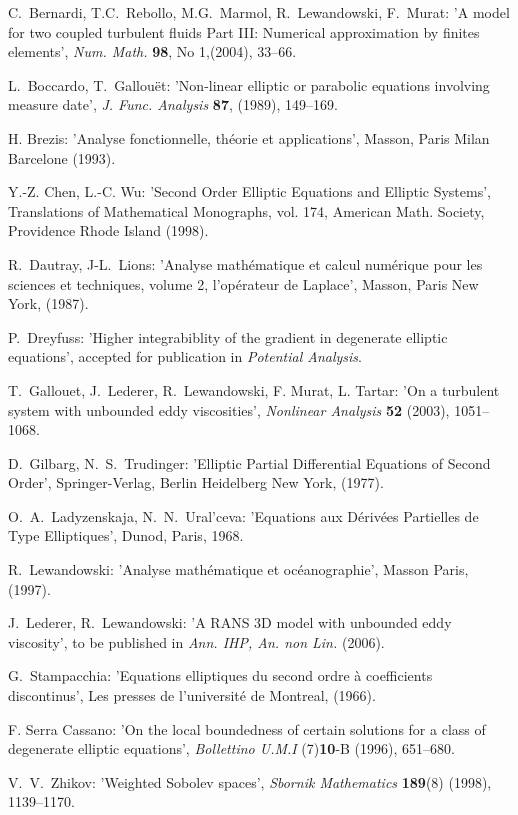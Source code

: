 \documentclass{elsart}
\begin{document}
\begin{thebibliography}{sto}

C.\ Bernardi, T.C.\ Rebollo, M.G.\ Marmol, R.\ Lewandowski, 
F.\ Murat: 
'A model for two coupled turbulent fluids Part III: Numerical 
approximation by finites elements',
{\it Num. Math.} {\bf 98}, No 1,(2004), 33--66.

L.\ Boccardo, T.\ Gallou\"et:
'Non-linear elliptic or parabolic equations involving measure date', 
{\it J. Func. Analysis} {\bf 87}, (1989), 149--169.

H. Brezis: 
'Analyse fonctionnelle, th\'eorie et applications', 
Masson, Paris Milan Barcelone (1993).

Y.-Z. Chen, L.-C. Wu:
'Second Order Elliptic Equations and Elliptic Systems',
Translations of Mathematical Monographs, vol. 174, 
American Math. Society, Providence Rhode Island (1998). 

R.\ Dautray, J-L.\ Lions:
'Analyse math\'ematique et calcul num\'erique pour les 
sciences et techniques, volume 2, l'op\'erateur de Laplace', 
Masson, Paris New York, (1987).

P.\ Dreyfuss:
'Higher integrabiblity of the gradient in degenerate elliptic
equations', 
accepted for publication in {\it Potential Analysis}.

T.\ Gallouet, J.\ Lederer, R.\ Lewandowski, F. Murat, L. Tartar:
'On a turbulent system with unbounded eddy viscosities', 
{\it Nonlinear Analysis} {\bf 52} (2003), 1051--1068.

D.\ Gilbarg, N.\ S.\ Trudinger:
'Elliptic Partial Differential Equations of Second Order', 
Springer-Verlag, Berlin Heidelberg New York, (1977).

O.\ A.\ Ladyzenskaja, N.\ N.\ Ural'ceva: 
'Equations aux D\'eriv\'ees Partielles de Type Elliptiques', Dunod,
Paris, 1968.

R.\ Lewandowski:
'Analyse math\'ematique et oc\'eanographie', 
Masson Paris, (1997).

J.\ Lederer, R.\ Lewandowski:
'A RANS 3D model with unbounded eddy viscosity',  
to be published in {\it Ann. IHP, An. non Lin.} (2006).

G.\ Stampacchia:
'Equations elliptiques du second ordre \`a coefficients 
discontinus', Les presses de l'universit\'e de Montreal, (1966).

F. Serra Cassano:
'On the local boundedness of certain solutions for a class of 
degenerate elliptic equations',  
{\it Bollettino U.M.I} (7){\bf 10}-B (1996), 651--680.

V.\ V.\ Zhikov:
'Weighted Sobolev spaces', 
{\it Sbornik Mathematics} {\bf 189}(8) (1998), 1139--1170.

\end{thebibliography}
\end{document}
